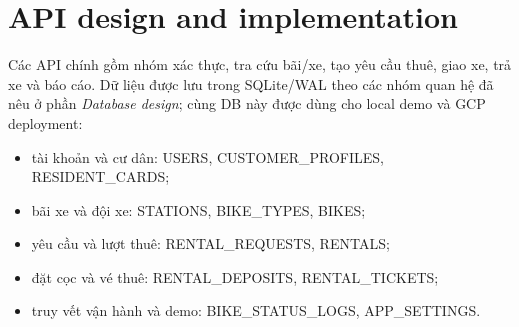 \section{API design and implementation}
Các API chính gồm nhóm xác thực, tra cứu bãi/xe, tạo yêu cầu thuê, giao xe, trả xe
và báo cáo. Dữ liệu được lưu trong SQLite/WAL theo các nhóm quan hệ đã nêu ở phần
\textit{Database design}; cùng DB này được dùng cho local demo và GCP deployment:
\begin{itemize}
  \item tài khoản và cư dân: USERS, CUSTOMER\_PROFILES, RESIDENT\_CARDS;
  \item bãi xe và đội xe: STATIONS, BIKE\_TYPES, BIKES;
  \item yêu cầu và lượt thuê: RENTAL\_REQUESTS, RENTALS;
  \item đặt cọc và vé thuê: RENTAL\_DEPOSITS, RENTAL\_TICKETS;
  \item truy vết vận hành và demo: BIKE\_STATUS\_LOGS, APP\_SETTINGS.
\end{itemize}

